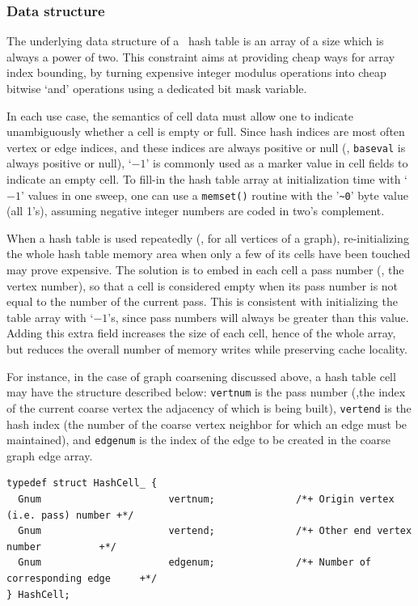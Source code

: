\subsubsection{Data structure}

The underlying data structure of a \scotch\ hash table is an array of
a size which is always a power of two. This constraint aims at
providing cheap ways for array index bounding, by turning expensive
integer modulus operations into cheap bitwise `and' operations using
a dedicated bit mask variable.

In each use case, the semantics of cell data must allow one to
indicate unambiguously whether a cell is empty or full. Since hash
indices are most often vertex or edge indices, and these indices are
always positive or null (\ie, \texttt{baseval} is always positive or
null), `$-1$' is commonly used as a marker value in cell fields to
indicate an empty cell. To fill-in the hash table array at
initialization time with `$-1$' values in one sweep, one can use a
\texttt{memset()} routine with the '\texttt{\~{}0}' byte value (all
1's), assuming negative integer numbers are coded in two's complement.

When a hash table is used repeatedly (\eg, for all vertices of a
graph), re-initializing the whole hash table memory area when only a
few of its cells have been touched may prove expensive. The solution
is to embed in each cell a pass number (\eg, the vertex number), so
that a cell is considered empty when its pass number is not equal to
the number of the current pass. This is consistent with initializing
the table array with `$-1$'s, since pass numbers will always be
greater than this value. Adding this extra field increases the size of
each cell, hence of the whole array, but reduces the overall number of
memory writes while preserving cache locality.

For instance, in the case of graph coarsening discussed above, a hash
table cell may have the structure described below: \texttt{vertnum} is
the pass number (\ie,the index of the current coarse vertex the
adjacency of which is being built), \texttt{vertend} is the hash index
(the number of the coarse vertex neighbor for which an edge must be
maintained), and \texttt{edgenum} is the index of the edge to be
created in the coarse graph edge array.

\begin{lstlisting}[style=language-c]
typedef struct HashCell_ {
  Gnum                      vertnum;              /*+ Origin vertex (i.e. pass) number +*/
  Gnum                      vertend;              /*+ Other end vertex number          +*/
  Gnum                      edgenum;              /*+ Number of corresponding edge     +*/
} HashCell;
\end{lstlisting}

